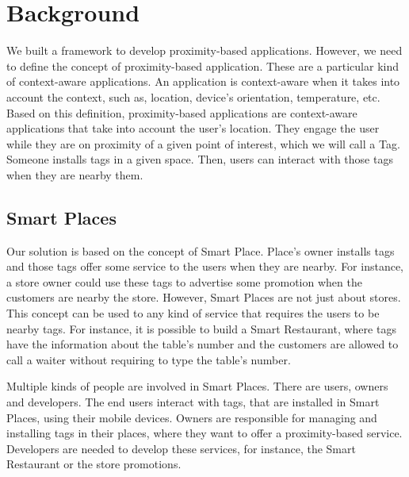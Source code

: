 
\section{Background}
\label{sec:background}
We built a framework to develop proximity-based applications.
However, we need to define the concept of proximity-based application.
These are a particular kind of context-aware applications.
An application is context-aware when it takes into account the context, such as, location, device's orientation, temperature, etc.
Based on this definition, proximity-based applications are context-aware applications that take into account the user's location.
They engage the user while they are on proximity of a given point of interest, which we will call a Tag.
Someone installs tags in a given space.
Then, users can interact with those tags when they are nearby them.

\subsection{Smart Places}
\label{sec:background_smart_places}
Our solution is based on the concept of Smart Place.
Place's owner installs tags and those tags offer some service to the users when they are nearby.
For instance, a store owner could use these tags to advertise some promotion when the customers are nearby the store.
However, Smart Places are not just about stores.
This concept can be used to any kind of service that requires the users to be nearby tags.
For instance, it is possible to build a Smart Restaurant, where tags have the information about the table's number and the customers are allowed to call a waiter without requiring to type the table's number.

Multiple kinds of people are involved in Smart Places.
There are users, owners and developers.
The end users interact with tags, that are installed in Smart Places, using their mobile devices.
Owners are responsible for managing and installing tags in their places, where they want to offer a proximity-based service.
Developers are needed to develop these services, for instance, the Smart Restaurant or the store promotions.


